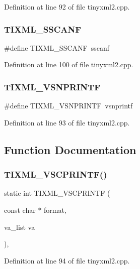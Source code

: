 Definition at line 92 of file tinyxml2.\+cpp.

\mbox{\label{tinyxml2_8cpp_a96f54d7c855ad92e705510904a040393}} 
\subsubsection{TIXML\_SSCANF}
{\footnotesize\ttfamily \#define T\+I\+X\+M\+L\+\_\+\+S\+S\+C\+A\+NF~sscanf}



Definition at line 100 of file tinyxml2.\+cpp.

\mbox{\label{tinyxml2_8cpp_a924d10d64b020e9dbcd2b8b024768608}} 
\subsubsection{TIXML\_VSNPRINTF}
{\footnotesize\ttfamily \#define T\+I\+X\+M\+L\+\_\+\+V\+S\+N\+P\+R\+I\+N\+TF~vsnprintf}



Definition at line 93 of file tinyxml2.\+cpp.



\subsection{Function Documentation}
\mbox{\label{tinyxml2_8cpp_a7afe6fa96e6614ee5b1109c8ee034942}} 
\subsubsection{TIXML\_VSCPRINTF()}
{\footnotesize\ttfamily static int T\+I\+X\+M\+L\+\_\+\+V\+S\+C\+P\+R\+I\+N\+TF (\begin{DoxyParamCaption}\item[{const char $\ast$}]{format,  }\item[{va\+\_\+list}]{va }\end{DoxyParamCaption})\hspace{0.3cm}{\ttfamily [inline]}, {\ttfamily [static]}}



Definition at line 94 of file tinyxml2.\+cpp.



